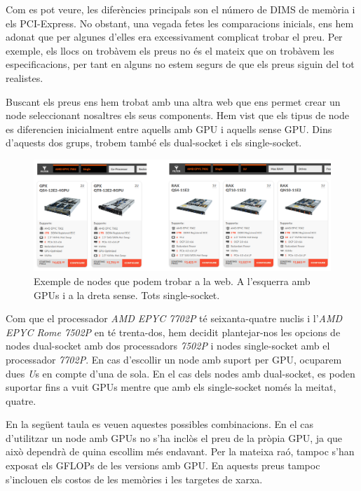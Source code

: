 Com es pot veure, les diferències principals son el número de DIMS de memòria i els PCI-Express. No obstant, una vegada fetes les comparacions inicials, ens hem adonat que per algunes d'elles era excessivament complicat trobar el preu. Per exemple, els llocs on trobàvem els preus no és el mateix que on trobàvem les especificacions, per tant en alguns no estem segurs de que els preus siguin del tot realistes.

Buscant els preus ens hem trobat amb una altra web \cite{webnodes} que ens permet crear un node seleccionant nosaltres els seus components. Hem vist que els tipus de node es diferencien inicialment entre aquells amb GPU i aquells sense GPU. Dins d'aquests dos grups, trobem també els dual-socket i els single-socket.

\begin{figure}[H]
    \centering
    \includegraphics[width=\textwidth]{img/webnodes.png}
    \caption{Exemple de nodes que podem trobar a la web. A l'esquerra amb GPUs i a la dreta sense. Tots single-socket.}
\end{figure}

Com que el processador \textit{AMD EPYC 7702P} té seixanta-quatre nuclis i l'\textit{AMD EPYC Rome 7502P} en té trenta-dos, hem decidit plantejar-nos les opcions de nodes dual-socket amb dos processadors \textit{7502P} i nodes single-socket amb el processador \textit{7702P}. En cas d'escollir un node amb suport per GPU, ocuparem dues \textit{U}s en compte d'una de sola. En el cas dels nodes amb dual-socket, es poden suportar fins a vuit GPUs mentre que amb els single-socket només la meitat, quatre.

 En la següent taula es veuen aquestes possibles combinacions. En el cas d'utilitzar un node amb GPUs no s'ha inclòs el preu de la pròpia GPU, ja que això dependrà de quina escollim més endavant. Per la mateixa raó, tampoc s'han exposat els GFLOPs de les versions amb GPU. En aquests preus tampoc s'inclouen els costos de les memòries i les targetes de xarxa.


